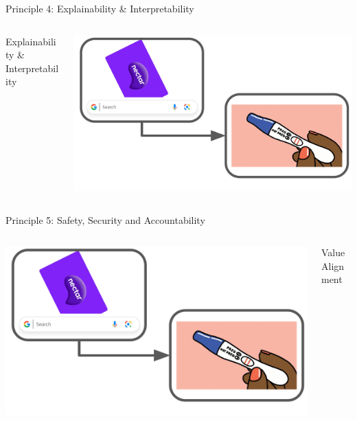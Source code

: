 \begin{frame}{Principle 4: Explainability \& Interpretability}
\begin{columns}
    \begin{column}{0.3 \textwidth}
    Explainability \& Interpretability
    \end{column}
    \begin{column}{0.7 \textwidth}
     \includegraphics[width = \textwidth, page = 6]{images/RSS_pictures.pdf}
    \end{column}
\end{columns}
\end{frame}

\begin{frame}{Principle 5: Safety, Security and Accountability}
\begin{columns}
    \begin{column}{0.6 \textwidth}
     \includegraphics[width = \textwidth, page = 7]{images/RSS_pictures.pdf}
    \end{column}
    \begin{column}{0.4 \textwidth}
    Value Alignment
    \end{column}
\end{columns}
\end{frame}



